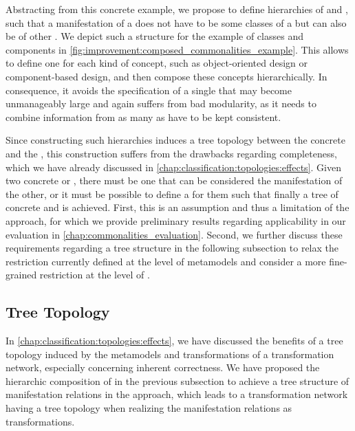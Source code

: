 Abstracting from this concrete example, we propose to define hierarchies of \commonalities and \conceptmetamodels, such that a manifestation of a \commonality does not have to be some classes of a \concretemetamodel but can also be \commonalities of other \conceptmetamodels.
We depict such a structure for the example of classes and components in \autoref{fig:improvement:composed_commonalities_example}.
This allows to define one \conceptmetamodel for each kind of concept, such as object-oriented design or component-based design, and then compose these concepts hierarchically.
In consequence, it avoids the specification of a single \conceptmetamodel that may become unmanageably large and again suffers from bad modularity, as it needs to combine information from as many \concretemetamodels as have to be kept consistent.

Since constructing such hierarchies induces a tree topology between the concrete and the \conceptmetamodels, this construction suffers from the drawbacks regarding completeness, which we have already discussed in \autoref{chap:classification:topologies:effects}.
Given two concrete or \conceptmetamodels, there must be one that can be considered the manifestation of the other, or it must be possible to define a \conceptmetamodel for them such that finally a tree of concrete and \conceptmetamodels is achieved.
First, this is an assumption and thus a limitation of the approach, for which we provide preliminary results regarding applicability in our evaluation in \autoref{chap:commonalities_evaluation}.
Second, we further discuss these requirements regarding a tree structure in the following subsection to relax the restriction currently defined at the level of metamodels and consider a more fine-grained restriction at the level of \metaclasses.


\subsection{Tree Topology}
\label{chap:improvement:commonalities:tree}

In \autoref{chap:classification:topologies:effects}, we have discussed the benefits of a tree topology induced by the metamodels and transformations of a transformation network, especially concerning inherent correctness.
We have proposed the hierarchic composition of \conceptmetamodels in the previous subsection to achieve a tree structure of manifestation relations in the \commonalities approach, which leads to a transformation network having a tree topology when realizing the manifestation relations as transformations.

